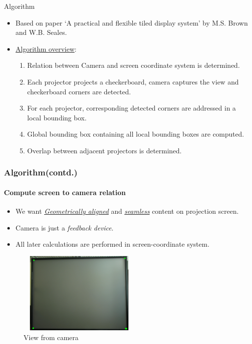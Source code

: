 \documentclass{beamer}
\begin{document}
\begin{frame}{Algorithm}
\begin{itemize}
\item Based on paper `A practical and flexible tiled
display system' by M.S. Brown and W.B. Seales.
\item \underline{Algorithm overview}:
\begin{enumerate}
\item Relation between Camera and screen coordinate system is determined.
\item Each projector projects a checkerboard, camera captures the view and checkerboard corners are detected.
\item For each projector, corresponding detected corners are addressed in a local bounding box. 
\item Global bounding box containing all local bounding boxes are computed. 
\item Overlap between adjacent projectors is determined. 
\end{enumerate}
\end{itemize}
\end{frame}


\begin{frame}
\frametitle{Algorithm(contd.)}
\framesubtitle{Compute screen to camera relation}
\begin{itemize}
\item We want \hyperlink{concept}{\textit{Geometrically aligned}} and \hyperlink{concept}{\textit{seamless}} content on projection screen.
\item Camera is just a \textit{feedback device}.
\item All later calculations are performed in screen-coordinate system.
\end{itemize}

\begin{figure}
\includegraphics[width=6cm, height = 4cm]{figures/debug_image_features.jpg}
\caption{View from camera}
\end{figure}
\end{frame}
\end{document}
